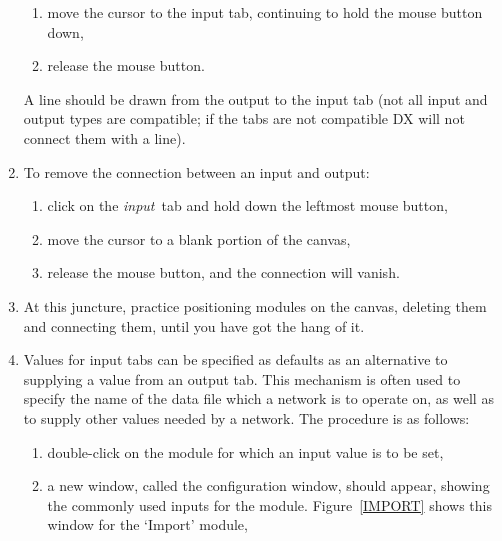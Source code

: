 \documentclass[twoside,11pt]{starlink}
\begin{document}
\begin{enumerate}
\begin{enumerate}
    \item move the cursor to the input tab, continuing to hold the
     mouse button down,

    \item release the mouse button.

  \end{enumerate}

   A line should be drawn from the output to the input tab (not all
   input and output types are compatible; if the tabs are not compatible
   DX will not connect them with a line).

  \item To remove the connection between an input and output:

  \begin{enumerate}

    \item click on the \textit{input}\, tab and hold down the leftmost
     mouse button,

    \item move the cursor to a blank portion of the canvas,

    \item release the mouse button, and the connection will vanish.

  \end{enumerate}

  \item At this juncture, practice positioning modules on the canvas,
   deleting them and connecting them, until you have got the hang of it.

  \item Values for input tabs can be specified as defaults as an
   alternative to supplying a value from an output tab. This mechanism
   is often used to specify the name of the data file which a network
   is to operate on, as well as to supply other values needed by a
   network. The procedure is as follows:

  \begin{enumerate}

    \item double-click on the module for which an input value is to be set,

    \item a new window, called the configuration window, should appear,
     showing the commonly used inputs for the module. Figure~\ref{IMPORT}
     shows this window for the `Import' module,

    \begin{figure}[htbp]


\end{figure}
\end{enumerate}
\end{enumerate}
\end{document}
